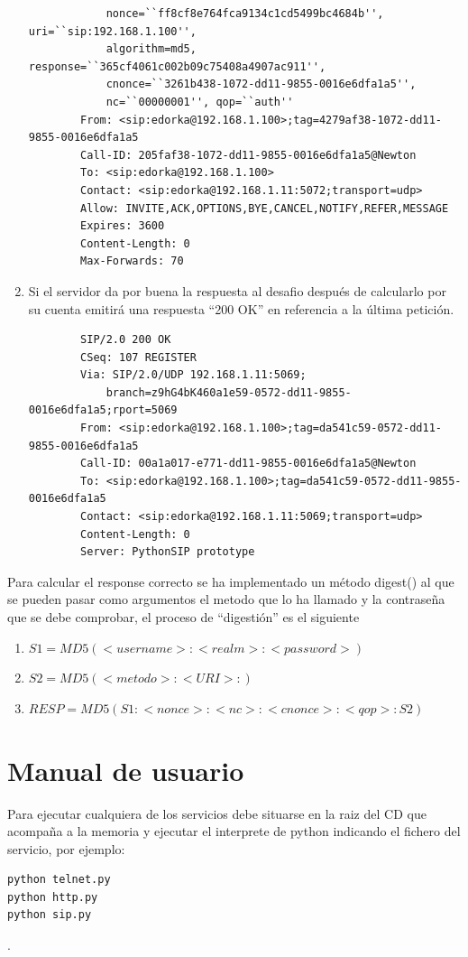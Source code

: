 \documentclass[a4paper,spanish,12pt]{book}
\begin{document}
\begin{enumerate}
\begin{verbatim}
			nonce=``ff8cf8e764fca9134c1cd5499bc4684b'', uri=``sip:192.168.1.100'', 
			algorithm=md5, response=``365cf4061c002b09c75408a4907ac911'', 
			cnonce=``3261b438-1072-dd11-9855-0016e6dfa1a5'', 
			nc=``00000001'', qop=``auth''
		From: <sip:edorka@192.168.1.100>;tag=4279af38-1072-dd11-9855-0016e6dfa1a5
		Call-ID: 205faf38-1072-dd11-9855-0016e6dfa1a5@Newton
		To: <sip:edorka@192.168.1.100>
		Contact: <sip:edorka@192.168.1.11:5072;transport=udp>
		Allow: INVITE,ACK,OPTIONS,BYE,CANCEL,NOTIFY,REFER,MESSAGE
		Expires: 3600
		Content-Length: 0
		Max-Forwards: 70
		\end{verbatim}
		\normalsize
	\item Si el servidor da por buena la respuesta al desafio despu\'es de calcularlo por su cuenta emitirá una respuesta ``200 OK'' en referencia a la última petición.
		\scriptsize
		\begin{verbatim}
		SIP/2.0 200 OK
		CSeq: 107 REGISTER
		Via: SIP/2.0/UDP 192.168.1.11:5069;
			branch=z9hG4bK460a1e59-0572-dd11-9855-0016e6dfa1a5;rport=5069
		From: <sip:edorka@192.168.1.100>;tag=da541c59-0572-dd11-9855-0016e6dfa1a5
		Call-ID: 00a1a017-e771-dd11-9855-0016e6dfa1a5@Newton
		To: <sip:edorka@192.168.1.100>;tag=da541c59-0572-dd11-9855-0016e6dfa1a5
		Contact: <sip:edorka@192.168.1.11:5069;transport=udp>
		Content-Length: 0
		Server: PythonSIP prototype
		\end{verbatim}
		\normalsize
\end{enumerate}
Para calcular el response correcto se ha implementado un m\'etodo digest() al que se pueden pasar como argumentos el metodo que lo ha llamado y la contraseña que se debe comprobar, el proceso de ``digestión'' es el siguiente
\begin{enumerate}
	\item \begin{math} S1 = MD5(<username>:<realm>:<password>) \end{math}
	\item \begin{math} S2 = MD5(<metodo>:<URI>:) \end{math}
	\item \begin{math} RESP = MD5(S1:<nonce>:<nc>:<cnonce>:<qop>:S2) \end{math}
\end{enumerate}
\section{Manual de usuario}
Para ejecutar cualquiera de los servicios debe situarse en la raiz del CD que acompaña a la memoria y ejecutar el interprete de python indicando el fichero del servicio, por ejemplo:
\begin{verbatim}
python telnet.py
python http.py
python sip.py
\end{verbatim}.
\end{document}
